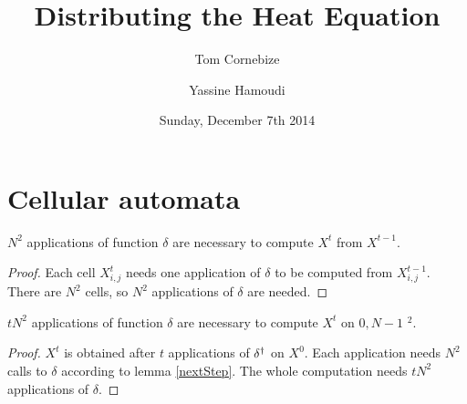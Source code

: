 


\title{Distributing the Heat Equation}
\author{Tom Cornebize \and Yassine Hamoudi}
\date{Sunday, December 7th 2014}



\maketitle


\section{Cellular automata}

\begin{question}

\begin{lemma}
  \label{nextStep}
  $N^2$ applications of function $\delta$ are necessary to compute $X^t$ from $X^{t-1}$.
\end{lemma}

\begin{proof}
 Each cell $X^{t}_{i,j}$ needs one application of $\delta$ to be computed from $X^{t-1}_{i,j}$. There are $N^2$ cells, so $N^2$ applications of $\delta$ are needed.
\end{proof}

\begin{prop}
  $tN^2$ applications of function $\delta$ are necessary to compute $X^t$ on \textlbrackdbl $0,N-1$ \textrbrackdbl$^2$.
\end{prop}

\begin{proof}
 $X^t$ is obtained after $t$ applications of $\delta^\dag$ on $X^0$. Each application needs $N^2$ calls to $\delta$ according to lemma \ref{nextStep}. The whole computation needs $tN^2$ applications of $\delta$.
\end{proof}

\end{question}

